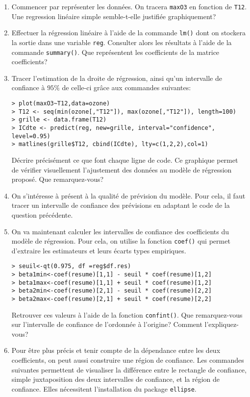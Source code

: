 \documentclass{td_um}
\providecommand{\1}{\mathds{1}}
\begin{document}
\begin{enumerate}
    \item Commencer par représenter les données. On tracera \texttt{maxO3} en fonction de \texttt{T12}. Une regression linéaire simple semble-t-elle justifiée graphiquement?
    \item Effectuer la régression linéaire à l'aide de la commande \texttt{lm()} dont on stockera la sortie dans une variable \texttt{reg}. Consulter alors les résultats à l'aide de la commande \texttt{summary()}. Que représentent les coefficients de la matrice coefficients?
\item Tracer l'estimation de la droite de régression, ainsi qu'un intervalle de confiance à $95 \%$ de celle-ci grâce aux commandes suivantes:
\begin{verbatim}
> plot(maxO3~T12,data=ozone)
> T12 <- seq(min(ozone[,"T12"]), max(ozone[,"T12"]), length=100)
> grille <- data.frame(T12)
> ICdte <- predict(reg, new=grille, interval="confidence", level=0.95)
> matlines(grille$T12, cbind(ICdte), lty=c(1,2,2),col=1)
\end{verbatim}
Décrire précisément ce que font chaque ligne de code. Ce graphique permet de vérifier visuellement l'ajustement des données au modèle de régression proposé. Que remarquez-vous?
\item On s'intéresse à présent à la qualité de prévision du modèle. Pour cela, il faut tracer un intervalle de confiance des prévisions en adaptant le code de la question précédente.
\item On va maintenant calculer les intervalles de confiance des coefficients du modèle de régression. Pour cela, on utilise la fonction \texttt{coef()} qui permet d'extraire les estimateurs et leurs écarts types empiriques.
\begin{verbatim}
> seuil<-qt(0.975, df =reg$df.res)
> beta1min<-coef(resume)[1,1] - seuil * coef(resume)[1,2]
> beta1max<-coef(resume)[1,1] + seuil * coef(resume)[1,2]
> beta2min<-coef(resume)[2,1] - seuil * coef(resume)[2,2]
> beta2max<-coef(resume)[2,1] + seuil * coef(resume)[2,2]
\end{verbatim}
Retrouver ces valeurs à l'aide de la fonction \texttt{confint()}. Que remarquez-vous sur l'intervalle de confiance de l'ordonnée à l'origine? Comment l'expliquez-vous?
\item Pour être plus précis et tenir compte de la dépendance entre les deux coefficients, on peut aussi construire une région de confiance. Les commandes suivantes permettent de visualiser la différence entre le rectangle de confiance, simple juxtaposition des deux intervalles de confiance, et la région de confiance. Elles nécessitent l'installation du package \texttt{ellipse}.

\end{enumerate}
\end{document}
